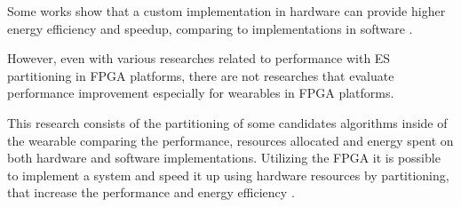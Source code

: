     
    Some works show that a custom implementation in hardware can provide higher energy efficiency and speedup, comparing to implementations in software \cite{Zhang2008, BenHajHassine2017, Wolf1994, Canis2011, Stone2010}.
    
    
    
    However, even with various researches related to performance with ES partitioning in FPGA platforms, there are not researches that evaluate performance improvement especially for wearables in FPGA platforms.
    
    
    
    This research consists of the partitioning of some candidates algorithms inside of the wearable comparing the performance, resources allocated and energy spent on both hardware and software implementations.
    Utilizing the FPGA it is possible to implement a system and speed it up using hardware resources by partitioning, that increase the performance and energy efficiency \cite{Cong2009, Lo2009, Zhang2008a}.
    
